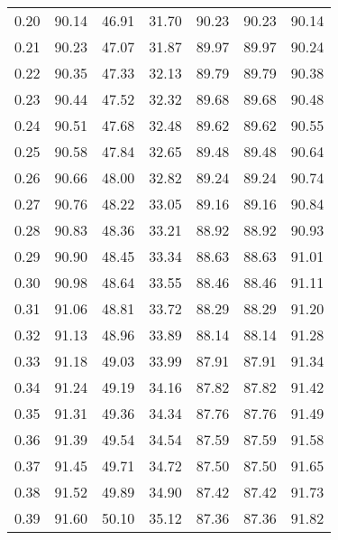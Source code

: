 \begin{tabular}{|c|c|c|c|c|c|c|}
      0.20 &     90.14 &     46.91 &      31.70 &   90.23 &      90.23 &         90.14 \\
      0.21 &     90.23 &     47.07 &      31.87 &   89.97 &      89.97 &         90.24 \\
      0.22 &     90.35 &     47.33 &      32.13 &   89.79 &      89.79 &         90.38 \\
      0.23 &     90.44 &     47.52 &      32.32 &   89.68 &      89.68 &         90.48 \\
      0.24 &     90.51 &     47.68 &      32.48 &   89.62 &      89.62 &         90.55 \\
      0.25 &     90.58 &     47.84 &      32.65 &   89.48 &      89.48 &         90.64 \\
      0.26 &     90.66 &     48.00 &      32.82 &   89.24 &      89.24 &         90.74 \\
      0.27 &     90.76 &     48.22 &      33.05 &   89.16 &      89.16 &         90.84 \\
      0.28 &     90.83 &     48.36 &      33.21 &   88.92 &      88.92 &         90.93 \\
      0.29 &     90.90 &     48.45 &      33.34 &   88.63 &      88.63 &         91.01 \\
      0.30 &     90.98 &     48.64 &      33.55 &   88.46 &      88.46 &         91.11 \\
      0.31 &     91.06 &     48.81 &      33.72 &   88.29 &      88.29 &         91.20 \\
      0.32 &     91.13 &     48.96 &      33.89 &   88.14 &      88.14 &         91.28 \\
      0.33 &     91.18 &     49.03 &      33.99 &   87.91 &      87.91 &         91.34 \\
      0.34 &     91.24 &     49.19 &      34.16 &   87.82 &      87.82 &         91.42 \\
      0.35 &     91.31 &     49.36 &      34.34 &   87.76 &      87.76 &         91.49 \\
      0.36 &     91.39 &     49.54 &      34.54 &   87.59 &      87.59 &         91.58 \\
      0.37 &     91.45 &     49.71 &      34.72 &   87.50 &      87.50 &         91.65 \\
      0.38 &     91.52 &     49.89 &      34.90 &   87.42 &      87.42 &         91.73 \\
      0.39 &     91.60 &     50.10 &      35.12 &   87.36 &      87.36 &         91.82 \\

\end{tabular}
